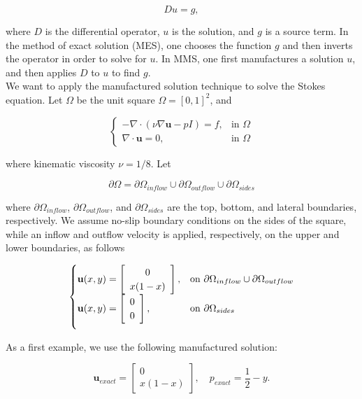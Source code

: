\documentclass[11pt,a4paper,titlepage]{report}
\begin{document}
\[
Du = g,
\]

where $D$ is the differential operator, $u$ is the solution, and $g$ is a source term. In the method of exact solution (MES), one chooses the function $g$ and then inverts the operator in order to solve for $u$. In MMS, one first manufactures a solution $u$, and then applies $D$ to $u$ to find $g$. \\

We want to apply the manufactured solution technique to solve the Stokes equation. Let $\Omega$ be the unit square $\Omega = [0,1]^2$, and 

\vspace{0.2cm}
\[
\begin{cases}
- \nabla \cdot (\nu \nabla \mathbf{u} - pI) = f, & \mbox{in } \Omega \\
\nabla \cdot \mathbf{u} = 0, & \mbox{in } \Omega
\end{cases}
\]
\vspace{0.2cm}

where kinematic viscosity $\nu = 1/8$. Let 

\[
\partial \Omega = \partial \Omega_{inflow} \cup \partial \Omega_{outflow} \cup \partial \Omega_{sides}
\]

where $\partial \Omega_{inflow}$, $\partial \Omega_{outflow}$, and $\partial \Omega_{sides}$ are the top, bottom, and lateral boundaries, respectively. We assume no-slip boundary conditions on the sides of the square, while an inflow and outflow velocity is applied, respectively, on the upper and lower boundaries, as follows

\[
\begin{cases}
\mathbf{u}(x,y) = \left[ \begin{array}{c} 0 \\ x(1-x) \end{array} \right] , & \mbox{on } \partial \Omega_{inflow} \cup \partial \Omega_{outflow} \\

\vspace{.2cm}

\mathbf{u}(x,y) = \left[ \begin{array}{c} 0 \\ 0 \end{array} \right], & \mbox{on } \partial \Omega_{sides}
\end{cases}
\]

As a first example, we use the following manufactured solution:

\[
\mathbf{u}_{exact} = \left[ \begin{array}{c} 0 \\ x(1-x) \end{array} \right], \quad 
p_{exact} = \frac{1}{2}-y.
\]
\end{document}
